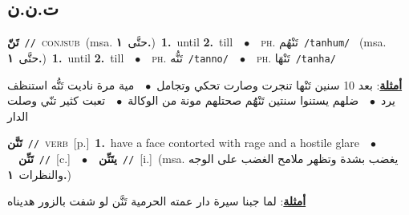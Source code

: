 \documentclass[10pt,a4paper,twoside]{article} %
\begin{document}
\begin{multicols}{2}
\vspace{-3mm}
\subsection*{\color{blue}\foreignlanguage{arabic}{ت.ن.ن}\color{blue}{}} 

{\setlength\topsep{0pt}\textbf{\foreignlanguage{arabic}{تَنّ}}\ {\color{gray}\texttt{//}\color{black}}\ \textsc{conj\textunderscore sub}\ \color{gray}(msa. \foreignlanguage{arabic}{حتَّى}~\foreignlanguage{arabic}{\textbf{١.}})\color{black}\ \textbf{1.}~until  \textbf{2.}~till\ \ $\bullet$\ \ \textsc{ph.} \color{gray} \foreignlanguage{arabic}{تَنْهُم}\color{black}\ {\color{gray}\texttt{/{\sffamily tanhum}/}\color{black}}\ \color{gray} (msa. \foreignlanguage{arabic}{حتَّى}~\foreignlanguage{arabic}{\textbf{١.}})\color{black}\ \textbf{1.}~until  \textbf{2.}~till\ \ $\bullet$\ \ \textsc{ph.} \color{gray} \foreignlanguage{arabic}{تَنُّه}\color{black}\ {\color{gray}\texttt{/{\sffamily tanno}/}\color{black}}\ \ $\bullet$\ \ \textsc{ph.} \color{gray} \foreignlanguage{arabic}{تَنْهَا}\color{black}\ {\color{gray}\texttt{/{\sffamily tanha}/}\color{black}}\  \begin{flushright}\color{gray}\foreignlanguage{arabic}{\textbf{\underline{\foreignlanguage{arabic}{أمثلة}}}: بعد 10 سنين تَنْها تنجرت وصارت تحكي وتجامل\ $\bullet$\ \  مية مرة ناديت تَنُّه استنظف يرد\ $\bullet$\ \  ضلهم يستنوا سنتين تَنْهَُم صحتلهم مونة من الوكالة\ $\bullet$\ \  تعبت كثير تنّي وصلت الدار}\end{flushright}\color{black}} \vspace{2mm}

{\setlength\topsep{0pt}\textbf{\foreignlanguage{arabic}{تَنَّن}}\ {\color{gray}\texttt{//}\color{black}}\ \textsc{verb}\ [p.]\ \textbf{1.}~have a face contorted with rage and a hostile glare\ \ $\bullet$\ \ \setlength\topsep{0pt}\textbf{\foreignlanguage{arabic}{تَنِّن}}\ {\color{gray}\texttt{//}\color{black}}\ [c.]\ \ $\bullet$\ \ \setlength\topsep{0pt}\textbf{\foreignlanguage{arabic}{يتَنِّن}}\ {\color{gray}\texttt{//}\color{black}}\ [i.]\ \color{gray}(msa. \foreignlanguage{arabic}{يغضب بشدة وتظهر ملامح الغضب على الوجه والنظرات}~\foreignlanguage{arabic}{\textbf{١.}})\color{black}\  \begin{flushright}\color{gray}\foreignlanguage{arabic}{\textbf{\underline{\foreignlanguage{arabic}{أمثلة}}}: لما جبنا سيرة دار عمته الحرمية تَنَّن لو شفت بالزور هديناه}\end{flushright}\color{black}} \vspace{2mm}


\end{multicols}
\end{document}
